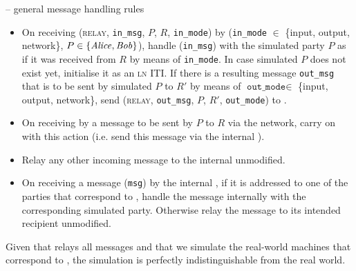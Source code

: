 \begin{center}
  \begin{simulatorbox}{\simulator{} -- general message handling rules}
    \begin{itemize}
      \item On receiving (\textsc{relay}, \texttt{in\_msg}, $P$, $R$,
      \texttt{in\_mode}) by \fchan (\texttt{in\_mode} $\in$ \{input, output,
      network\}, $P \in \{\mathit{Alice}, \mathit{Bob}\}$), handle (\texttt{in\_msg}) with the
      simulated party $P$ as if it was received from $R$ by means of
      \texttt{in\_mode}. In case simulated $P$ does not exist yet, initialise it
      as an \textsc{ln} ITI. If there is a resulting message \texttt{out\_msg}
      that is to be sent by simulated $P$ to $R'$ by means of
      $\texttt{out\_mode} \in$ \{input, output, network\}, send (\textsc{relay},
      \texttt{out\_msg}, $P$, $R'$, \texttt{out\_mode}) to \fchan.
      \item On receiving by \fchan a message to be sent by $P$ to $R$ via the
      network, carry on with this action (i.e. send this message via the
      internal \adversary).
      \item Relay any other incoming message to the internal \adversary
      unmodified.
      \item On receiving a message (\texttt{msg}) by the internal \adversary, if it is
      addressed to one of the parties that correspond to \fchan, handle the
      message internally with the corresponding simulated party. Otherwise relay
      the message to its intended recipient unmodified. 
    \end{itemize}

    Given that \fchan relays all messages and that we simulate the real-world
    machines that correspond to \fchan, the simulation is perfectly
    indistinguishable from the real world.
  \end{simulatorbox}
  \label{code:simulator:flow}
\end{center} \ \\

